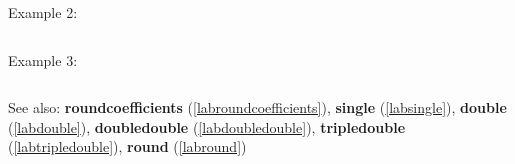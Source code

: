 \noindent Example 2: 
\begin{center}\begin{minipage}{15cm}\begin{Verbatim}[frame=single]
\end{Verbatim}
\end{minipage}\end{center}
\noindent Example 3: 
\begin{center}\begin{minipage}{15cm}\begin{Verbatim}[frame=single]
\end{Verbatim}
\end{minipage}\end{center}
See also: \textbf{roundcoefficients} (\ref{labroundcoefficients}), \textbf{single} (\ref{labsingle}), \textbf{double} (\ref{labdouble}), \textbf{doubledouble} (\ref{labdoubledouble}), \textbf{tripledouble} (\ref{labtripledouble}), \textbf{round} (\ref{labround})
